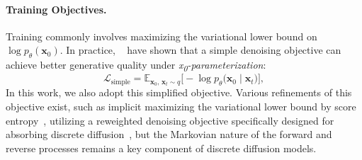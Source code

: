 \paragraph{Training Objectives.}
Training commonly involves maximizing the variational lower bound on \(\log p_\theta(\mathbf{x}_0)\). In practice, ~\citep{d3pm} have shown that a simple denoising objective can achieve better generative quality under \textit{x\textsubscript{0}-parameterization}:
\begin{equation}
    \label{eq:vanilla_loss}
    \mathcal{L}_{\text{simple}}
    = \mathbb{E}_{\mathbf{x}_0,\, \mathbf{x}_t \sim q}
      \bigl[
        -\log p_\theta\bigl(\mathbf{x}_0 \mid \mathbf{x}_t\bigr)
      \bigr],
\end{equation}
In this work, we also adopt this simplified objective. Various refinements of this objective exist, such as implicit maximizing the variational lower bound by score entropy~\citep{lou2024discretediffusionmodelingestimating}, utilizing a reweighted denoising objective specifically designed for absorbing discrete diffusion~\citep{mdlm}, but the Markovian nature of the forward and reverse processes remains a key component of discrete diffusion models.






